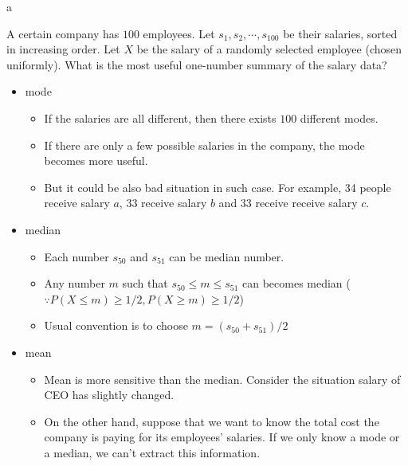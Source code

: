 \documentclass[8pt]{beamer}
\begin{document}
\begin{frame}{a}
    \begin{example}
        A certain company has $100$ employees. Let $s_1, s_2, \cdots, s_{100}$ be their salaries, sorted in increasing order. Let $X$ be the salary of a randomly selected employee (chosen uniformly). What is the most useful one-number summary of the salary data?
    \end{example}

    \begin{itemize}
        \item mode
        \begin{itemize}
            \item If the salaries are all different, then there exists $100$ different modes. 
            \item If there are only a few possible salaries in the company, the mode becomes more useful.
            \item But it could be also bad situation in such case. For example, 34 people receive salary $a$, 33 receive salary $b$ and 33 receive receive salary $c$.
        \end{itemize}
        \item median 
        \begin{itemize}
            \item Each number $s_{50}$ and $s_{51}$ can be median number.
            \item Any number $m$ such that $s_{50} \leq m \leq s_{51}$ can becomes median ($\because P(X \leq m) \geq 1/2, P(X \geq m) \geq 1/2$)
            \item Usual convention is to choose $m = (s_{50}+s_{51})/2$
        \end{itemize}
        \item mean
        \begin{itemize}
            \item Mean is more sensitive than the median. Consider the situation salary of CEO has slightly changed.
            \item On the other hand, suppose that we want to know the total cost the company is paying for its employees' salaries. If we only know a mode or a median, we can't extract this information.
        \end{itemize}
    \end{itemize}
\end{frame}
\end{document}

